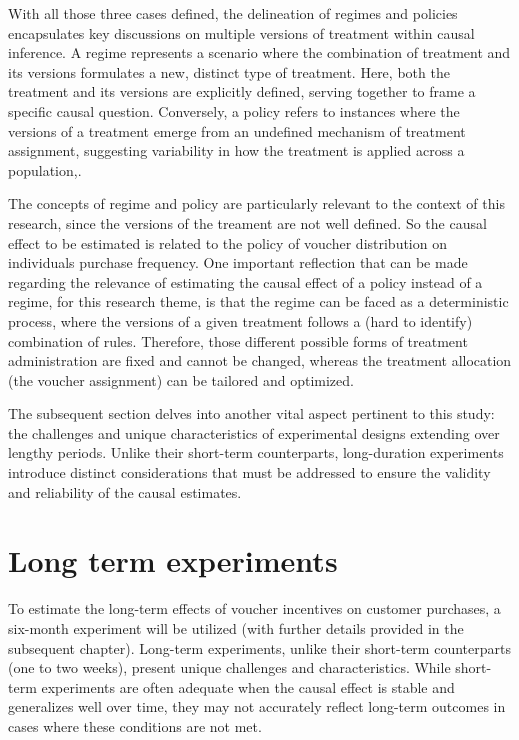 With all those three cases defined, the delineation of regimes and policies encapsulates key discussions on multiple versions of treatment within causal inference.
A regime represents a scenario where the combination of treatment and its versions formulates a new, distinct type of treatment. Here, both the treatment
and its versions are explicitly defined, serving together to frame a specific causal question. Conversely, a policy refers to instances where the versions 
of a treatment emerge from an undefined mechanism of treatment assignment, suggesting variability in how the treatment is applied across a population,\parencite{vanderweeleCausalInferenceMultiple2013}.

The concepts of regime and policy are particularly relevant to the context of this research, since the versions of the treament are not well defined. So the causal effect to be estimated
is related to the policy of voucher distribution on individuals purchase frequency. One important reflection that can be made regarding the relevance of estimating the causal effect of a policy 
instead of a regime, for this research theme, is that the regime can be faced as a deterministic process, where the versions of a given treatment follows a (hard to identify) combination of rules. Therefore,
those different possible forms of treatment administration are fixed and cannot be changed, whereas the treatment allocation (the voucher assignment) can be tailored and optimized.

The subsequent section delves into another vital aspect pertinent to this study: the challenges and unique characteristics of experimental designs extending over 
lengthy periods. Unlike their short-term counterparts, long-duration experiments introduce distinct considerations that must be addressed to ensure the validity and reliability of the causal estimates.

\section{Long term experiments}
\label{sec:long_term_experiments}

To estimate the long-term effects of voucher incentives on customer purchases, a six-month experiment will be utilized (with further details provided in the subsequent chapter).
Long-term experiments, unlike their short-term counterparts (one to two weeks), present unique challenges and characteristics. While short-term experiments are often adequate 
when the causal effect is stable and generalizes well over time, they may not accurately reflect long-term outcomes in cases where these conditions are not met.

